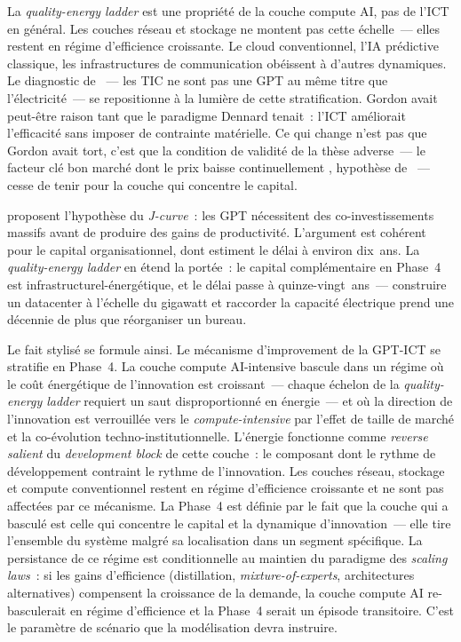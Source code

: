 La \emph{quality-energy ladder} est une propriété de la couche compute AI, pas de l'ICT en général. Les couches réseau et stockage ne montent pas cette échelle~--- elles restent en régime d'efficience croissante. Le cloud conventionnel, l'IA prédictive classique, les infrastructures de communication obéissent à d'autres dynamiques. Le diagnostic de \textcite{gordon_does_2000}~--- les TIC ne sont pas une GPT au même titre que l'électricité~--- se repositionne à la lumière de cette stratification. Gordon avait peut-être raison tant que le paradigme Dennard tenait~: l'ICT améliorait l'efficacité sans imposer de contrainte matérielle. Ce qui change n'est pas que Gordon avait tort, c'est que la condition de validité de la thèse adverse~--- le facteur clé bon marché dont le prix baisse continuellement \parencite{bresnahan_general_1995}, hypothèse de \textcite{perez_technological_2002}~--- cesse de tenir pour la couche qui concentre le capital.

\textcite{brynjolfsson_artificial_2019} proposent l'hypothèse du \emph{J-curve}~: les GPT nécessitent des co-investissements massifs avant de produire des gains de productivité. L'argument est cohérent pour le capital organisationnel, dont \textcite{bresnahan_information_2002} estiment le délai à environ dix~ans. La \emph{quality-energy ladder} en étend la portée~: le capital complémentaire en Phase~4 est infrastructurel-énergétique, et le délai passe à quinze-vingt~ans~--- construire un datacenter à l'échelle du gigawatt et raccorder la capacité électrique prend une décennie de plus que réorganiser un bureau.

Le fait stylisé se formule ainsi. Le mécanisme d'improvement de la GPT-ICT se stratifie en Phase~4. La couche compute AI-intensive bascule dans un régime où le coût énergétique de l'innovation est croissant~--- chaque échelon de la \emph{quality-energy ladder} requiert un saut disproportionné en énergie~--- et où la direction de l'innovation est verrouillée vers le \emph{compute-intensive} par l'effet de taille de marché et la co-évolution techno-institutionnelle. L'énergie fonctionne comme \emph{reverse salient} du \emph{development block} de cette couche~: le composant dont le rythme de développement contraint le rythme de l'innovation. Les couches réseau, stockage et compute conventionnel restent en régime d'efficience croissante et ne sont pas affectées par ce mécanisme. La Phase~4 est définie par le fait que la couche qui a basculé est celle qui concentre le capital et la dynamique d'innovation~--- elle tire l'ensemble du système malgré sa localisation dans un segment spécifique. La persistance de ce régime est conditionnelle au maintien du paradigme des \emph{scaling laws}~: si les gains d'efficience (distillation, \emph{mixture-of-experts}, architectures alternatives) compensent la croissance de la demande, la couche compute AI re-basculerait en régime d'efficience et la Phase~4 serait un épisode transitoire. C'est le paramètre de scénario que la modélisation devra instruire.


